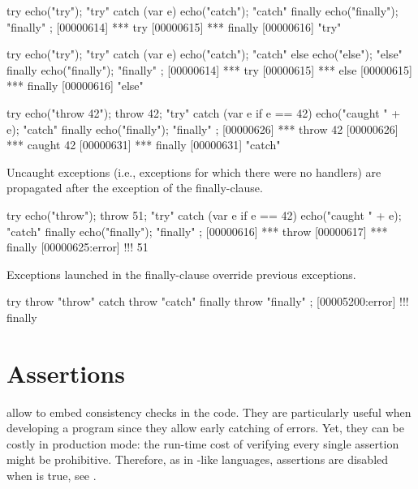 \begin{urbiscript}
try           { echo("try");     "try" }
catch (var e) { echo("catch");   "catch" }
finally       { echo("finally"); "finally" };
[00000614] *** try
[00000615] *** finally
[00000616] "try"

try           { echo("try");     "try" }
catch (var e) { echo("catch");   "catch" }
else          { echo("else");    "else" }
finally       { echo("finally"); "finally" };
[00000614] *** try
[00000615] *** else
[00000615] *** finally
[00000616] "else"

try                      { echo("throw 42"); throw 42; "try" }
catch (var e if e == 42) { echo("caught " + e);        "catch" }
finally                  { echo("finally");            "finally" };
[00000626] *** throw 42
[00000626] *** caught 42
[00000631] *** finally
[00000631] "catch"
\end{urbiscript}


Uncaught exceptions (i.e., exceptions for which there were no handlers) are
propagated after the exception of the finally-clause.

\begin{urbiscript}
try                      { echo("throw"); throw 51; "try" }
catch (var e if e == 42) { echo("caught " + e);     "catch" }
finally                  { echo("finally");         "finally" };
[00000616] *** throw
[00000617] *** finally
[00000625:error] !!! 51
\end{urbiscript}

Exceptions launched in the finally-clause override previous exceptions.

\begin{urbiscript}
try     { throw "throw" }
catch   { throw "catch" }
finally { throw "finally" };
[00005200:error] !!! finally
\end{urbiscript}



\section{Assertions}
\label{sec:lang:assert}


 allow to embed consistency checks in the code.
They are particularly useful when developing a program since they allow
early catching of errors.  Yet, they can be costly in production mode: the
run-time cost of verifying every single assertion might be prohibitive.
Therefore, as in \langC-like languages, assertions are disabled when
 is true, see .

